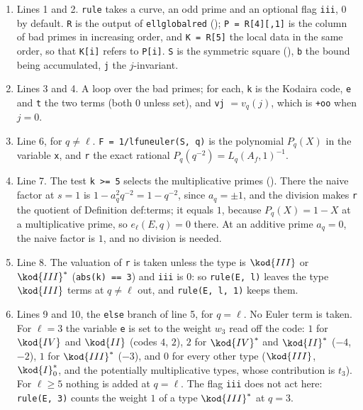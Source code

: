 \begin{sloppypar}
\begin{remark}\label{rem:computation:rule-reading}
\begin{enumerate}[label=(\alph*)]
\item Lines 1 and 2. \texttt{rule} takes a curve, an odd prime and an optional flag \texttt{iii}, $0$ by default. \texttt{R} is the output of
\texttt{ellglobalred} (); \texttt{P = R[4][,1]} is the column of bad primes in increasing order, and
\texttt{K = R[5]} the local data in the same order, so that \texttt{K[i]} refers to \texttt{P[i]}. \texttt{S} is the symmetric square
(), \texttt{b} the bound being accumulated, \texttt{j} the $j$-invariant.
\item Lines 3 and 4. A loop over the bad primes; for each, \texttt{k} is the Kodaira code, \texttt{e} and \texttt{t} the two terms (both $0$ unless
set), and \texttt{vj} $=v_q(j)$, which is \texttt{+oo} when $j=0$.
\item Line 6, for $q\ne\ell$. \texttt{F = 1/lfuneuler(S, q)} is the polynomial $P_q(X)$ in the variable \texttt{x}, and \texttt{r} the exact
rational $P_q(q^{-2})=L_q(A_f,1)^{-1}$.
\item Line 7. The test \texttt{k >= 5} selects the multiplicative primes (). There the naive factor at $s=1$ is
$1-a_q^2q^{-2}=1-q^{-2}$, since $a_q=\pm1$, and the division makes \texttt{r} the quotient of Definition def:terms; it equals $1$, because
$P_q(X)=1-X$ at a multiplicative prime, so $e_\ell(E,q)=0$ there. At an additive prime $a_q=0$, the naive factor is $1$, and no division is
needed.
\item Line 8. The valuation of \texttt{r} is taken unless the type is $\kod{III}$ or $\kod{III}^*$ (\texttt{abs(k) == 3}) and \texttt{iii} is $0$: so
\texttt{rule(E, l)} leaves the type $\kod{III}$ terms at $q\ne\ell$ out, and \texttt{rule(E, l, 1)} keeps them.
\item Lines 9 and 10, the \texttt{else} branch of line 5, for $q=\ell$. No Euler term is taken. For $\ell=3$ the variable \texttt{e} is set to the
weight $w_3$ read off the code: $1$ for $\kod{IV}$ and $\kod{II}$ (codes $4$, $2$), $2$ for $\kod{IV}^*$ and $\kod{II}^*$ ($-4$, $-2$), $1$ for $\kod{III}^*$ ($-3$), and $0$ for
every other type ($\kod{III}$, $\kod{I}_0^*$, and the potentially multiplicative types, whose contribution is $t_3$). For $\ell\ge5$ nothing is added
at $q=\ell$. The flag \texttt{iii} does not act here: \texttt{rule(E, 3)} counts the weight $1$ of a type $\kod{III}^*$ at $q=3$.

\end{enumerate}
\end{remark}
\end{sloppypar}
